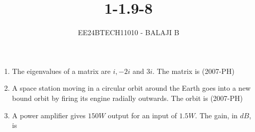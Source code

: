 \documentclass[journal]{IEEEtran}
\begin{document}

\vspace{3cm}

\title{1-1.9-8}
\author{EE24BTECH11010 - BALAJI B}
{\let\newpage\relax\maketitle}

\renewcommand{\thefigure}{\theenumi}
\renewcommand{\thetable}{\theenumi}
\setlength{\intextsep}{10pt} %
\renewcommand{\thetable}{\theenumi}
\begin{enumerate}
    \item The eigenvalues of a matrix are $i, -2i$ and $3i$. The matrix is \hfill (2007-PH)
    \begin{enumerate}
    \end{enumerate}
    \item A space station moving in a circular orbit around the Earth goes into a new bound orbit by firing its engine radially outwards. The orbit is \hfill (2007-PH)
    \begin{enumerate}
    \end{enumerate}
    \item A power amplifier gives $150W$ output for an input of $1.5W$. The gain, in $dB$, is
    

\end{enumerate}
\end{document}

